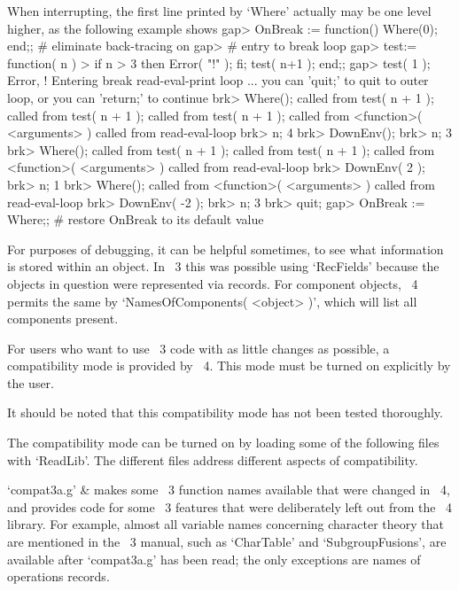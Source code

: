 When interrupting, the first line printed by `Where' actually may be
one level higher, as the following example shows
\begintt
gap> OnBreak := function() Where(0); end;; # eliminate back-tracing on
gap>                                       # entry to break loop
gap> test:= function( n )
>    if n > 3 then Error( "!\n" ); fi; test( n+1 ); end;;
gap> test( 1 );
Error, !
Entering break read-eval-print loop ...
you can 'quit;' to quit to outer loop, or
you can 'return;' to continue
brk> Where();
 called from
test( n + 1 ); called from
test( n + 1 ); called from
test( n + 1 ); called from
<function>( <arguments> ) called from read-eval-loop
brk> n;
4
brk> DownEnv();
brk> n;
3
brk> Where();  
 called from
test( n + 1 ); called from
test( n + 1 ); called from
<function>( <arguments> ) called from read-eval-loop
brk> DownEnv( 2 );
brk> n;
1
brk> Where();     
 called from
<function>( <arguments> ) called from read-eval-loop
brk> DownEnv( -2 );
brk> n;
3
brk> quit;
gap> OnBreak := Where;; # restore OnBreak to its default value
\endtt

For purposes of debugging, it can be helpful sometimes, to see what
information is stored within an object. In {\GAP}~3 this was possible using
`RecFields' because the objects in question were represented via records.
For component objects, {\GAP}~4 permits the same by
`NamesOfComponents( <object> )', which will list all components present.



For users who want to use {\GAP}~3 code with as little changes as
possible, a compatibility mode is provided by {\GAP}~4.
This mode must be turned on explicitly by the user.

It should be noted that this compatibility mode has not been tested
thoroughly.

The compatibility mode can be turned on by loading some of the following
files with `ReadLib'.
The different files address different aspects of compatibility.

\beginitems
`compat3a.g' &
    makes some {\GAP}~3 function names available that were changed
    in {\GAP}~4,
    and provides code for some {\GAP}~3 features that were
    deliberately left out from the {\GAP}~4 library.
    For example,
    almost all variable names concerning character theory that are
    mentioned in the {\GAP}~3 manual,
    such as `CharTable' and `SubgroupFusions',
    are available after `compat3a.g' has been read;
    the only exceptions are names of operations records.

